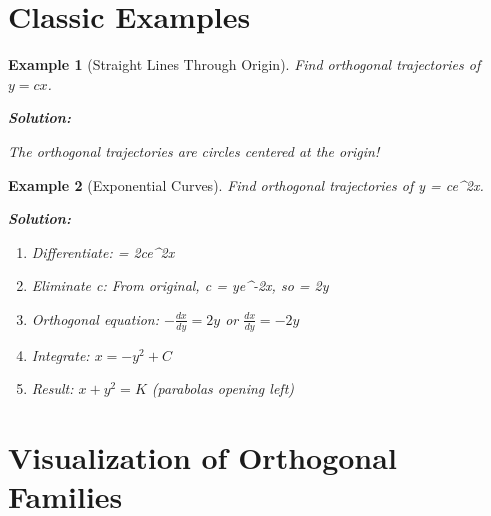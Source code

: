 \documentclass[12pt]{article}
\newtheorem{example}{Example}
\begin{document}
\section{Classic Examples}

\begin{example}[Straight Lines Through Origin]
Find orthogonal trajectories of $y = cx$.

\textbf{Solution:}
The orthogonal trajectories are circles centered at the origin!
\end{example}

\begin{example}[Exponential Curves]
Find orthogonal trajectories of y = ce^{2x}.

\textbf{Solution:}
\begin{enumerate}
    \item Differentiate:  = 2ce^{2x}
    \item Eliminate c: From original, c = ye^{-2x}, so  = 2y
    \item Orthogonal equation: $- = 2y$ or $ = -2y$
    \item Integrate: $x = -y^{2} + C$
    \item Result: $x + y^{2} = K$ (parabolas opening left)
\end{enumerate}
\end{example}

\section{Visualization of Orthogonal Families}
\end{document}
